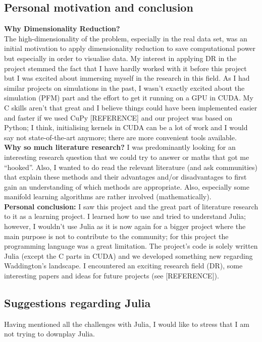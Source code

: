 \documentclass[journal, a4paper]{IEEEtran}
\begin{document}
\subsection{Personal motivation and conclusion}\label{personalconclusion}
\textbf{Why Dimensionality Reduction?}\\
The high-dimensionality of the problem, especially in the real data set, was an initial motivation to apply dimensionality reduction to save computational power but especially in order to visualise data. %
My interest in applying DR in the project stemmed the fact that I have hardly worked with it before this project but I was excited about immersing myself in the research in this field. As I had similar projects on simulations in the past, I wasn’t exactly excited about the simulation (PFM) part and the effort to get it running on a GPU in CUDA. My C skills aren’t that great and I believe things could have been implemented easier and faster if we used CuPy [REFERENCE] and our project was based on Python; I think, initialising kernels in CUDA can be a lot of work and I would say not state-of-the-art anymore; there are more convenient tools available. 
\\
\textbf{Why so much literature research?}
I was predominantly looking for an interesting research question that we could try to answer or maths that got me “hooked”. Also, I wanted to do read the relevant literature (and ask communities) that explain these methods and their advantages and/or disadvantages to first gain an understanding of which methods are appropriate. Also, especially some manifold learning algorithms are rather involved (mathematically).
\\
\textbf{Personal conclusion: }
I saw this project and the great part of literature research to it as a learning project. I learned how to use and tried to understand Julia; however, I wouldn’t use Julia as it is now again for a bigger project where the main purpose is not to contribute to the community; for this project the programming language was a great limitation.
The project’s code is solely written Julia (except the C parts in CUDA) and we developed something new regarding Waddington’s landscape. I encountered an exciting research field (DR), some interesting papers and ideas for future projects (see [REFERENCE]).


\subsection{Suggestions regarding Julia}\label{suggestionsjulia}
Having mentioned all the challenges with Julia, I would like to stress that I am not trying to downplay Julia. \\
\end{document}
